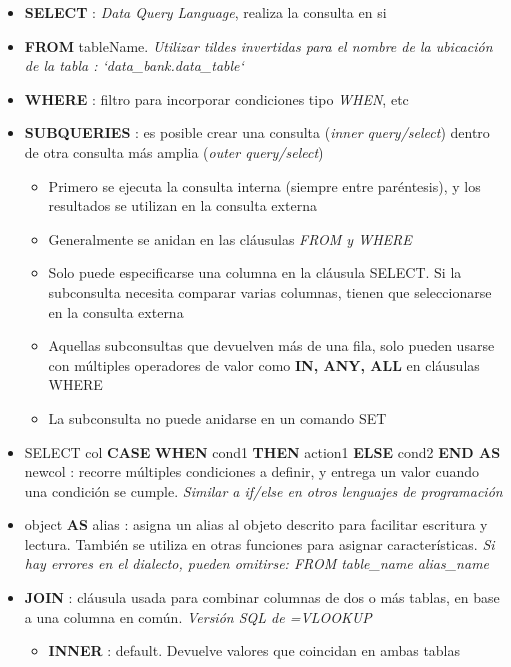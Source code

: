 \begin{itemize}
    \item {\textbf{SELECT} : \textit{Data Query Language}, realiza la consulta en si}
    \item {\textbf{FROM} tableName. \textit{Utilizar tildes invertidas para el nombre de la ubicación de la tabla : `data\_bank.data\_table`}}
    \item {\textbf{WHERE} : filtro para incorporar condiciones tipo \textit{WHEN}, etc}
    \item {\textbf{SUBQUERIES} : es posible crear una consulta (\textit{inner query/select}) dentro de otra consulta más amplia (\textit{outer query/select}) 
    \begin{itemize}
        \item {Primero se ejecuta la consulta interna (siempre entre paréntesis), y los resultados se utilizan en la consulta externa}
        \item {Generalmente se anidan en las cláusulas \textit{FROM y WHERE}}
        \item {Solo puede especificarse una columna en la cláusula SELECT. Si la subconsulta necesita comparar varias columnas, tienen que seleccionarse en la consulta externa}
        \item {Aquellas subconsultas que devuelven más de una fila, solo pueden usarse con múltiples operadores de valor como \textbf{IN, ANY, ALL} en cláusulas WHERE}
        \item {La subconsulta no puede anidarse en un comando SET}
    \end{itemize}}
    \item {SELECT col \textbf{CASE} \textbf{WHEN} cond1 \textbf{THEN} action1 \textbf{ELSE} cond2 \textbf{END AS} newcol : recorre múltiples condiciones a definir, y entrega un valor cuando una condición se cumple. \textit{Similar a if/else en otros lenguajes de programación}}
    \item {object \textbf{AS} alias : asigna un alias al objeto descrito para facilitar escritura y lectura. También se utiliza en otras funciones para asignar características. \textit{Si hay errores en el dialecto, pueden omitirse: FROM table\_name alias\_name}}
    \item {\textbf{JOIN} : cláusula usada para combinar columnas de dos o más tablas, en base a una columna en común. \textit{Versión SQL de =VLOOKUP}
    \begin{itemize}
        \item {\textbf{INNER} : default. Devuelve valores que coincidan en ambas tablas}

\end{itemize}}
\end{itemize}
